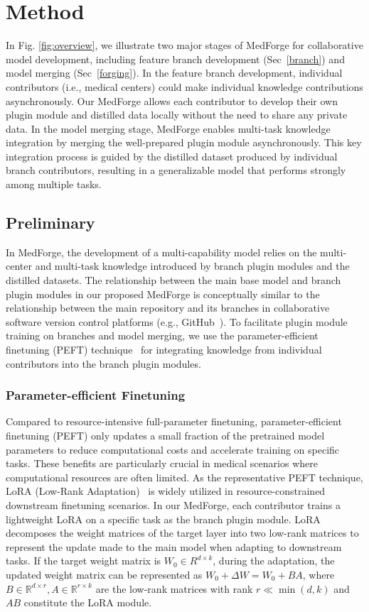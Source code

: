 \section{Method}

In Fig. \ref{fig:overview}, we illustrate two major stages of MedForge for collaborative model development, including feature branch development (Sec~\ref{branch}) and model merging (Sec~\ref{forging}). In the feature branch development, individual contributors (i.e., medical centers) could make individual knowledge contributions asynchronously. Our MedForge allows each contributor to develop their own plugin module and distilled data locally without the need to share any private data. In the model merging stage, MedForge enables multi-task knowledge integration by merging the well-prepared plugin module asynchronously. This key integration process is guided by the distilled dataset produced by individual branch contributors, resulting in a generalizable model that performs strongly among multiple tasks.


\subsection{Preliminary}
\label{pre}
In MedForge, the development of a multi-capability model relies on the multi-center and multi-task knowledge introduced by branch plugin modules and the distilled datasets.
The relationship between the main base model and branch plugin modules in our proposed MedForge is conceptually similar to the relationship between the main repository and its branches in collaborative software version control platforms (e.g., GitHub~\cite{github}). 
To facilitate plugin module training on branches and model merging, we use the parameter-efficient finetuning (PEFT) technique~\cite{hu2021lora} for integrating knowledge from individual contributors into the branch plugin modules. 

\subsubsection{Parameter-efficient Finetuning}
Compared to resource-intensive full-parameter finetuning, parameter-efficient finetuning (PEFT) only updates a small fraction of the pretrained model parameters to reduce computational costs and accelerate training on specific tasks. These benefits are particularly crucial in medical scenarios where computational resources are often limited.
As the representative PEFT technique, LoRA (Low-Rank Adaptation)~\cite{hu2021lora} is widely utilized in resource-constrained downstream finetuning scenarios. In our MedForge, each contributor trains a lightweight LoRA on a specific task as the branch plugin module. LoRA decomposes the weight matrices of the target layer into two low-rank matrices to represent the update made to the main model when adapting to downstream tasks. If the target weight matrix is $W_0 \in R^{d \times k}$, during the adaptation, the updated weight matrix can be represented as $W_0+\Delta W=W_0+B A$, where $B \in \mathbb{R}^{d \times r}, A \in \mathbb{R}^{r \times k}$ are the low-rank matrices with rank $r \ll  \min (d, k)$ and $AB$ constitute the LoRA module. 



